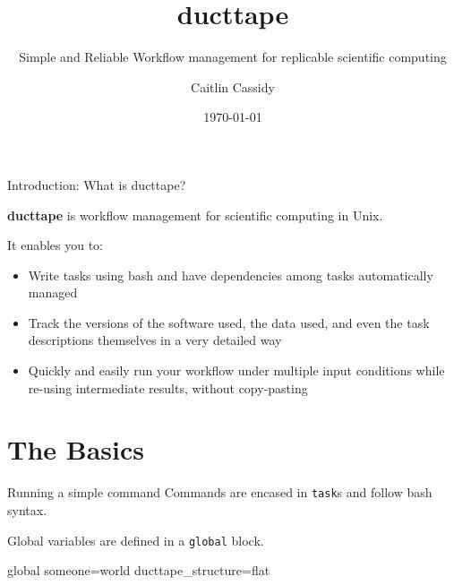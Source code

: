 \documentclass[10pt]{beamer}
\title{ducttape}
\subtitle{Simple and Reliable Workflow management for replicable scientific computing}
\date{\today}
\author{Caitlin Cassidy}
\institute{The University of Illinois at Urbana-Champaign}
\begin{document}
\maketitle



\begin{frame}[fragile]{Introduction: What is ducttape?}

  \textbf{ducttape} is workflow management for scientific computing in Unix.

  It enables you to:

  \begin{itemize}

  \item Write tasks using bash and have dependencies among tasks automatically managed
  \item Track the versions of the software used, the data used, and even the task descriptions themselves in a very detailed way
  \item Quickly and easily run your workflow under multiple input conditions while re-using intermediate results, without copy-pasting

  \end{itemize}

\end{frame}

\section{The Basics}

\begin{frame}[fragile]{Running a simple command}
Commands are encased in \texttt{task}s and follow bash syntax.
Global variables are defined in a \texttt{global} block.
\begin{code}
global {
  someone=world
  ducttape_structure=flat
}
\end{code}
\end{frame}
\end{document}
